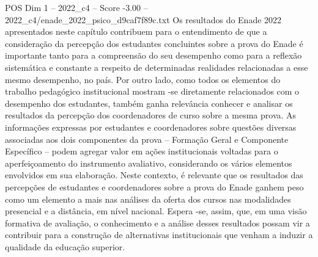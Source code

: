 \begin{textsample}{POS Dim 1 – 2022\_c4 – Score -3.00 – 2022\_c4/enade\_2022\_psico\_d9caf7f89c.txt}
Os resultados do Enade 2022 apresentados neste capítulo contribuem para o entendimento de que a consideração da percepção dos estudantes concluintes sobre a prova do Enade é importante tanto para a compreensão do seu desempenho como para a reflexão sistemática e constante a respeito de determinadas realidades relacionadas a esse mesmo desempenho, no país.
Por outro lado, como todos os elementos do trabalho pedagógico institucional mostram -se diretamente relacionados com o desempenho dos estudantes, também ganha relevância conhecer e analisar os resultados da percepção dos coordenadores de curso sobre a mesma prova.
As informações expressas por estudantes e coordenadores sobre questões diversas associadas aos dois componentes da prova – Formação Geral e Componente Específico – podem agregar valor em ações institucionais voltadas para o aperfeiçoamento do instrumento avaliativo, considerando os vários elementos envolvidos em sua elaboração.
Neste contexto, é relevante que os resultados das percepções de estudantes e coordenadores sobre a prova do Enade ganhem peso como um elemento a mais nas análises da oferta dos cursos nas modalidades presencial e a distância, em nível nacional.
Espera -se, assim, que, em uma visão formativa de avaliação, o conhecimento e a análise desses resultados possam vir a contribuir para a construção de alternativas institucionais que venham a induzir a qualidade da educação superior.

\end{textsample}
